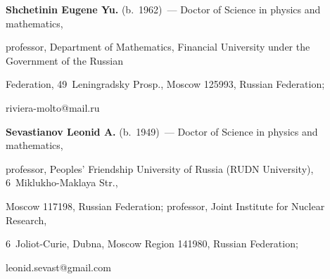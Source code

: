 \Contr



\noindent

\textbf{Shchetinin Eugene Yu.} (b.\ 1962)~--- Doctor of Science in physics and mathematics, 

professor, Department of Mathematics, Financial University under the Government of the Russian 

Federation, 49~Leningradsky Prosp., Moscow 125993, Russian Federation;  

\mbox{riviera-molto@mail.ru}



\vspace*{3pt}



\noindent

\textbf{Sevastianov Leonid A.} (b.\ 1949)~--- Doctor of Science in physics and mathematics, 

professor, Peoples' Friendship University of Russia (RUDN University), 6~Miklukho-Maklaya Str., 

Moscow 117198, Russian Federation; professor, Joint Institute for Nuclear Research,  

6~Joliot-Curie, Dubna, Moscow Region 141980, Russian Federation; 

\mbox{leonid.sevast@gmail.com}







\label{end\stat}



\renewcommand{\bibname}{\protect\rm Литература}

